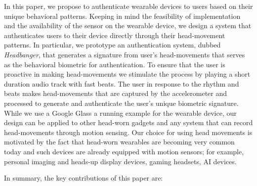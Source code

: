 \vspace{1mm}
In this paper, we propose to authenticate wearable devices to users based on
their unique behavioral patterns. Keeping in mind the feasibility of
implementation and the availability of the sensor on the wearable device,
we design a system that authenticates users to their device directly through
their head-movement patterns.
In particular, we prototype an authentication system, dubbed {\em Headbanger},
that generates a signature from user's head-movements that serves as the
behavioral biometric for authentication. To ensure that the user is proactive
in making head-movements we stimulate the process by playing a short duration
audio track with fast beats. The user in response to the rhythm and beats
makes head-movements that are captured by the accelerometer and processed to
generate and authenticate the user's unique biometric signature.
While we use a Google Glass a running example for the wearable device, our
design can be applied to other head-worn gadgets and any system that can
record head-movements through motion sensing.
Our choice for using head movements is motivated by the fact that head-worn
wearables are becoming very common today and such devices are already equipped
with motion sensors; for example, personal imaging and heads-up display
devices, gaming headsets, AI devices.



In summary, the key contributions of this paper are:

